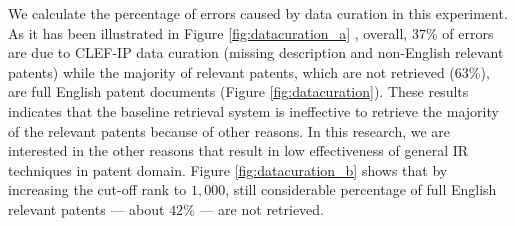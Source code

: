 We calculate the percentage of errors caused by data curation in this experiment. As it has been illustrated in Figure \ref{fig:datacuration_a}
, overall, $37\%$ of errors are due to CLEF-IP data curation (missing description and non-English relevant patents) while the majority of relevant patents, which are not retrieved ($63\%$), are full English patent documents (Figure \ref{fig:datacuration}). These results indicates that the baseline retrieval system is ineffective to retrieve the majority of the relevant patents because of other reasons. In this research, we are interested in the other reasons that result in low effectiveness of general IR techniques in patent domain. Figure \ref{fig:datacuration_b} shows that by increasing the cut-off rank to $1,000$, still considerable percentage of full English relevant patents --- about $42\%$ --- are not retrieved.








